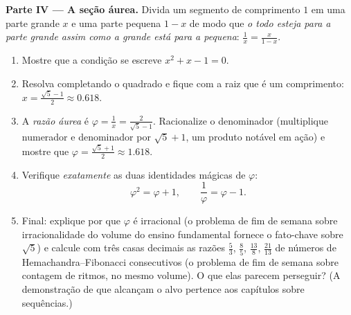 \begin{problem}[{Problema de fim de semana --- problemas de soma e
produto, completar o quadrado como al-Khwarizmi o desenhou, e a
equação $x^2 = x + 1$}]
\medskip
\noindent\textbf{Parte IV --- A seção áurea.}
Divida um segmento de comprimento $1$ em uma parte grande $x$ e
uma parte pequena $1 - x$ de modo que
\emph{o todo esteja para a parte grande assim como a grande está
para a pequena}: $\frac{1}{x} = \frac{x}{1 - x}$.
\begin{enumerate}[resume]
  \item Mostre que a condição se escreve $x^2 + x - 1 = 0$.
  \item Resolva completando o quadrado e fique com a raiz que é
        um comprimento: $x = \frac{\sqrt5 - 1}{2} \approx 0.618$.
  \item A \emph{razão áurea} é
        $\varphi = \frac1x = \frac{2}{\sqrt5 - 1}$. Racionalize o
        denominador (multiplique numerador e denominador por
        $\sqrt5 + 1$, um produto notável em ação) e mostre que
        $\varphi = \frac{\sqrt5 + 1}{2} \approx 1.618$.
  \item Verifique \emph{exatamente} as duas identidades mágicas
        de $\varphi$:
        \[
        \varphi^2 = \varphi + 1,
        \qquad
        \frac{1}{\varphi} = \varphi - 1 .
        \]
  \item Final: explique por que $\varphi$ é irracional (o
        problema de fim de semana sobre irracionalidade do volume
        do ensino fundamental fornece o fato-chave sobre
        $\sqrt5$) e calcule com três casas decimais as razões
        $\frac53$, $\frac85$, $\frac{13}{8}$, $\frac{21}{13}$ de
        números de Hemachandra--Fibonacci consecutivos (o
        problema de fim de semana sobre contagem de ritmos, no
        mesmo volume). O que elas parecem perseguir? (A
        demonstração de que alcançam o alvo pertence aos
        capítulos sobre sequências.)
\end{enumerate}
\end{problem}
